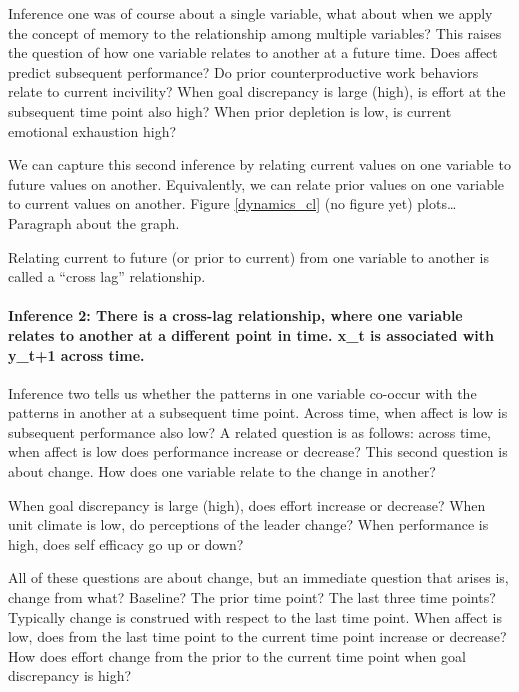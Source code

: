 \documentclass[english,,man]{apa6}
\let\oldparagraph\paragraph
\renewcommand{\paragraph}[1]{\oldparagraph{#1}\mbox{}}
\theoremstyle{definition}
\theoremstyle{definition}
\theoremstyle{definition}
\theoremstyle{remark}
\begin{document}
Inference one was of course about a single variable, what about when we
apply the concept of memory to the relationship among multiple
variables? This raises the question of how one variable relates to
another at a future time. Does affect predict subsequent performance? Do
prior counterproductive work behaviors relate to current incivility?
When goal discrepancy is large (high), is effort at the subsequent time
point also high? When prior depletion is low, is current emotional
exhaustion high?

We can capture this second inference by relating current values on one
variable to future values on another. Equivalently, we can relate prior
values on one variable to current values on another. Figure
\ref{dynamics_cl} (no figure yet) plots\ldots{}Paragraph about the
graph.

Relating current to future (or prior to current) from one variable to
another is called a \enquote{cross lag} relationship.

\hypertarget{inference-2-there-is-a-cross-lag-relationship-where-one-variable-relates-to-another-at-a-different-point-in-time.-x_t-is-associated-with-y_t1-across-time.}{%
\paragraph{Inference 2: There is a cross-lag relationship, where one
variable relates to another at a different point in time. x\_t is
associated with y\_t+1 across
time.}\label{inference-2-there-is-a-cross-lag-relationship-where-one-variable-relates-to-another-at-a-different-point-in-time.-x_t-is-associated-with-y_t1-across-time.}}

Inference two tells us whether the patterns in one variable co-occur
with the patterns in another at a subsequent time point. Across time,
when affect is low is subsequent performance also low? A related
question is as follows: across time, when affect is low does performance
increase or decrease? This second question is about change. How does one
variable relate to the change in another?

When goal discrepancy is large (high), does effort increase or decrease?
When unit climate is low, do perceptions of the leader change? When
performance is high, does self efficacy go up or down?

All of these questions are about change, but an immediate question that
arises is, change from what? Baseline? The prior time point? The last
three time points? Typically change is construed with respect to the
last time point. When affect is low, does from the last time point to
the current time point increase or decrease? How does effort change from
the prior to the current time point when goal discrepancy is high?
\end{document}
